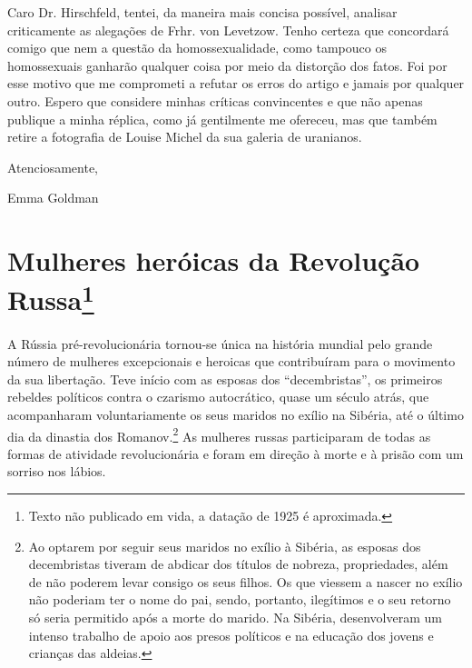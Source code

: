 Caro Dr. Hirschfeld, tentei, da maneira mais concisa possível, analisar
criticamente as alegações de Frhr. von Levetzow. Tenho certeza que
concordará comigo que nem a questão da homossexualidade, como tampouco
os homossexuais ganharão qualquer coisa por meio da distorção dos fatos.
Foi por esse motivo que me comprometi a refutar os erros do artigo e
jamais por qualquer outro. Espero que considere minhas críticas
convincentes e que não apenas publique a minha réplica, como já
gentilmente me ofereceu, mas que também retire a fotografia de Louise
Michel da sua galeria de uranianos.

Atenciosamente,

Emma Goldman

\chapter[Mulheres heróicas da Revolução Russa (1925)]{Mulheres heróicas da Revolução Russa\footnote[*]{Texto não publicado em
  vida, a datação de 1925 é aproximada.}}



A Rússia pré-revolucionária tornou-se única na história mundial pelo
grande número de mulheres excepcionais e heroicas que contribuíram para
o movimento da sua libertação. Teve início com as esposas dos
``decembristas'', os primeiros rebeldes políticos contra o czarismo
autocrático, quase um século atrás, que acompanharam voluntariamente os
seus maridos no exílio na Sibéria, até o último dia da dinastia dos
Romanov.\footnote{Ao optarem por seguir seus maridos no exílio à
  Sibéria, as esposas dos decembristas tiveram de abdicar dos títulos de
  nobreza, propriedades, além de não poderem levar consigo os seus
  filhos. Os que viessem a nascer no exílio não poderiam ter o nome do
  pai, sendo, portanto, ilegítimos e o seu retorno só seria permitido
  após a morte do marido. Na Sibéria, desenvolveram um intenso trabalho
  de apoio aos presos políticos e na educação dos jovens e crianças das
  aldeias.} As mulheres russas participaram de todas as formas de
atividade revolucionária e foram em direção à morte e à prisão com um
sorriso nos lábios.

